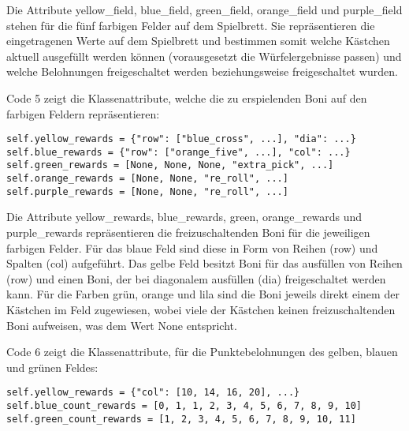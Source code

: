 Die Attribute yellow\_field, blue\_field, green\_field, orange\_field und purple\_field stehen für die fünf farbigen Felder auf dem Spielbrett. Sie repräsentieren die eingetragenen Werte auf dem Spielbrett und bestimmen somit welche Kästchen aktuell ausgefüllt werden können (vorausgesetzt die Würfelergebnisse passen) und welche Belohnungen freigeschaltet werden beziehungsweise freigeschaltet wurden.\\

\begin{minipage}{\linewidth}
Code 5 zeigt die Klassenattribute, welche die zu erspielenden Boni auf den farbigen Feldern repräsentieren:
\vspace{0.5cm}
\begin{lstlisting}[caption={Klassenattribute für freizuschaltende Boni}, basicstyle=\ttfamily]
self.yellow_rewards = {"row": ["blue_cross", ...], "dia": ...}
self.blue_rewards = {"row": ["orange_five", ...], "col": ...}
self.green_rewards = [None, None, None, "extra_pick", ...]
self.orange_rewards = [None, None, "re_roll", ...]
self.purple_rewards = [None, None, "re_roll", ...]
\end{lstlisting}
\end{minipage}

Die Attribute yellow\_rewards, blue\_rewards, green, orange\_rewards und purple\_rewards repräsentieren die freizuschaltenden Boni für die jeweiligen farbigen Felder. Für das blaue Feld sind diese in Form von Reihen (row) und Spalten (col) aufgeführt. Das gelbe Feld besitzt Boni für das ausfüllen von Reihen (row) und einen Boni, der bei diagonalem ausfüllen (dia) freigeschaltet werden kann. Für die Farben grün, orange und lila sind die Boni jeweils direkt einem der Kästchen im Feld zugewiesen, wobei viele der Kästchen keinen freizuschaltenden Boni aufweisen, was dem Wert None entspricht.\\

\begin{minipage}{\linewidth}
Code 6 zeigt die Klassenattribute, für die Punktebelohnungen des gelben, blauen und grünen Feldes:
\vspace{0.5cm}
\begin{lstlisting}[caption={Klassenattribute für freizuschaltende Punktebelohnungen des gelben, blauen und grünen Feldes}, basicstyle=\ttfamily]
self.yellow_rewards = {"col": [10, 14, 16, 20], ...}
self.blue_count_rewards = [0, 1, 1, 2, 3, 4, 5, 6, 7, 8, 9, 10]
self.green_count_rewards = [1, 2, 3, 4, 5, 6, 7, 8, 9, 10, 11]
\end{lstlisting}
\end{minipage}

